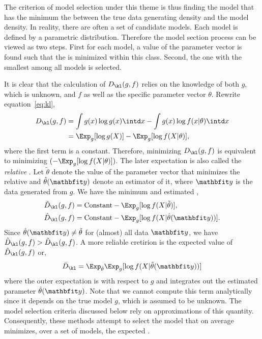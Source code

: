 The criterion of model selection under this theme is thus finding the model
that has the minimum the \kld between the true data generating density and the
model density. In reality, there are often a set of candidate models. Each
model is defined by a parametric distribution. Therefore the model section
process can be viewed as two steps. First for each model, a value of the
parameter vector is found such that the \kld is minimized within this class.
Second, the one with the smallest \kld among all models is selected.

It is clear that the calculation of $D_{\kl}(g,f)$ relies on the knowledge of
both $g$, which is unknown, and $f$ as well as the specific parameter vector
$\theta$. Rewrite equation~\eqref{eq:kl},
\begin{align}
  D_{\kl}(g,f)
  &= \int g(x)\log g(x) \intd x - \int g(x) \log f(x|\theta) \intd x \notag\\
  &= \Exp_g[\log g(X)] - \Exp_g[\log f(X|\theta)],
\end{align}
where the first term is a constant. Therefore, minimizing $D_{\kl}(g,f)$ is
equivalent to minimizing $(-\Exp_g[\log f(X|\theta)])$. The later expectation
is also called the \emph{relative} \kld. Let $\tilde\theta$ denote the value
of the parameter vector that minimizes the relative \kld and
$\hat\theta(\data)$ denote an estimator of it, where $\data$ is the data
generated from $g$. We have the minimum and estimated \kld,
\begin{align}
  \tilde{D}_{\kl}(g,f) &= \text{Constant} - \Exp_g[\log f(X|\tilde\theta)], \\
  \hat{D}_{\kl}(g,f) &= \text{Constant} - \Exp_g[\log f(X|\hat\theta(\data))].
\end{align}
Since $\hat\theta(\data)\ne\tilde\theta$ for (almost) all data $\data$, we
have $\hat{D}_{\kl}(g,f) > \tilde{D}_{\kl}(g,f)$. A more reliable cretirion
is the expected value of $\hat{D}_{\kl}(g,f)$ or,
\begin{equation}
  \bar{D}_{\kl} = \Exp_{\hat\theta}\Exp_g[\log f(X|\hat\theta(\data))]
  \label{eq:expected kl}
\end{equation}
where the outer expectation is with respect to $g$ and integrates out the
estimated parameter $\hat\theta(\data)$. Note that we cannot compute this term
analytically since it depends on the true model $g$, which is assumed to be
unknown. The model selection criteria discussed below rely on approximations
of this quantity. Consequently, these methods attempt to select the model
that on average minimizes, over a set of models, the expected \kld.

